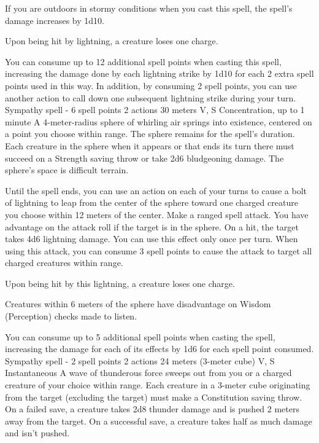         If you are outdoors in stormy conditions when you cast this spell, the spell's damage increases by 1d10.

        Upon being hit by lightning, a creature loses one charge.

        You can consume up to 12 additional spell points when casting this spell, increasing the damage done by each lightning strike by 1d10 for each 2 extra spell points used in this way.
        In addition, by consuming 2 spell points, you can use another action to call down one subsequent lightning strike during your turn.
        {Sympathy spell - 6 spell points}
        {2 actions}
        {30 meters}
        {V, S}
        {Concentration, up to 1 minute}
        A 4-meter-radius sphere of whirling air springs into existence, centered on a point you choose within range.
        The sphere remains for the spell's duration.
        Each creature in the sphere when it appears or that ends its turn there must succeed on a Strength saving throw or take 2d6 bludgeoning damage.
        The sphere's space is difficult terrain.

        Until the spell ends, you can use an action on each of your turns to cause a bolt of lightning to leap from the center of the sphere toward one charged creature you choose within 12 meters of the center.
        Make a ranged spell attack.
        You have advantage on the attack roll if the target is in the sphere.
        On a hit, the target takes 4d6 lightning damage.
        You can use this effect only once per turn.
        When using this attack, you can consume 3 spell points to cause the attack to target all charged creatures within range.

        Upon being hit by this lightning, a creature loses one charge.

        Creatures within 6 meters of the sphere have disadvantage on Wisdom (Perception) checks made to listen.

        You can consume up to 5 additional spell points when casting the spell, increasing the damage for each of its effects by 1d6 for each spell point consumed.
        {Sympathy spell - 2 spell points}
        {2 actions}
        {24 meters (3-meter cube)}
        {V, S}
        {Instantaneous}
        A wave of thunderous force sweeps out from you or a charged creature of your choice within range.
        Each creature in a 3-meter cube originating from the target (excluding the target) must make a Constitution saving throw.
        On a failed save, a creature takes 2d8 thunder damage and is pushed 2 meters away from the target.
        On a successful save, a creature takes half as much damage and isn't pushed.


